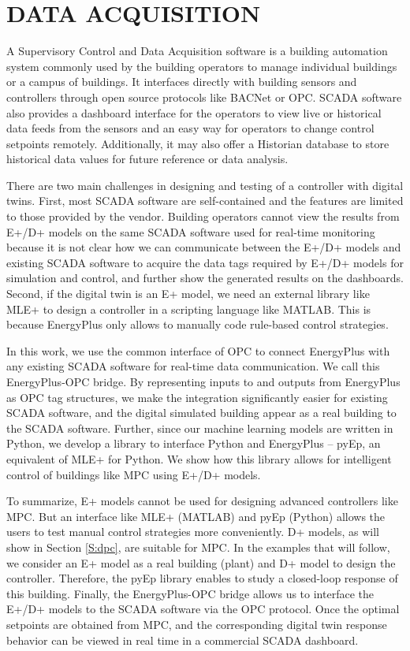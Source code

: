 \section{DATA ACQUISITION}

A Supervisory Control and Data Acquisition software is a building automation system commonly used by the building operators to manage individual buildings or a campus of buildings. 
It interfaces directly with building sensors and controllers through open source protocols like BACNet or OPC. 
SCADA software also provides a dashboard interface for the operators to view live or historical data feeds from the sensors and an easy way for operators to change control setpoints remotely. 
Additionally, it may also offer a Historian database to store historical data values for future reference or data analysis.

There are two main challenges in designing and testing of a controller with digital twins.
First, most SCADA software are self-contained and the features are limited to those provided by the vendor.
Building operators cannot view the results from E+/D+ models on the same SCADA software used for real-time monitoring because it is not clear how we can communicate between the E+/D+ models and existing SCADA software to acquire the data tags required by E+/D+ models for simulation and control, and further show the generated results on the dashboards.
Second, if the digital twin is an E+ model, we need an external library like MLE+ \cite{Nghiem2010} to design a controller in a scripting language like MATLAB. This is because EnergyPlus only allows to manually code rule-based control strategies.

In this work, we use the common interface of OPC to connect EnergyPlus with any existing SCADA software for real-time data communication. 
We call this EnergyPlus-OPC bridge.
By representing inputs to and outputs from EnergyPlus as OPC tag structures, we make the integration significantly easier for existing SCADA software, and the digital simulated building appear as a real building to the SCADA software.
Further, since our machine learning models are written in Python, we develop a library to interface Python and EnergyPlus -- pyEp, an equivalent of MLE+ for Python.
We show how this library allows for intelligent control of buildings like MPC using E+/D+ models.

To summarize, E+ models cannot be used for designing advanced controllers like MPC. 
But an interface like MLE+ (MATLAB) and pyEp (Python) allows the users to test manual control strategies more conveniently.
D+ models, as will show in Section \ref{S:dpc}, are suitable for MPC.
In the examples that will follow, we consider an E+ model as a real building (plant) and D+ model to design the controller.
Therefore, the pyEp library enables to study a closed-loop response of this building.
Finally, the EnergyPlus-OPC bridge allows us to interface the E+/D+ models to the SCADA software via the OPC protocol.
Once the optimal setpoints are obtained from MPC, and the corresponding digital twin response behavior can be viewed in real time in a commercial SCADA dashboard.

